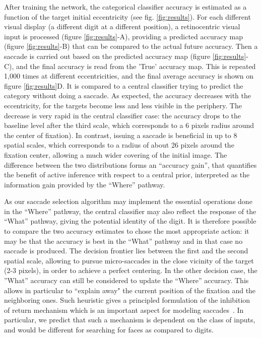 After training the network, the categorical classifier accuracy is estimated as a function of the target initial eccentricity (see fig. \ref{fig:results}). For each different visual display (a different digit at a different position), a retinocentric visual input is processed (figure \ref{fig:results}-A), providing a predicted accuracy map (figure \ref{fig:results}-B) that can be compared to the actual future accuracy. Then a saccade is carried out based on the predicted accuracy map (figure \ref{fig:results}-C), and the final accuracy is read from the 'True' accuracy map. This is repeated 1,000 times at different eccentricities, and the final average accuracy is shown on figure \ref{fig:results}D. It is compared to a central classifier trying to predict the category without doing a saccade.  
As expected, the  accuracy decreases with the eccentricity, for the targets become less and less visible in the periphery. 
The decrease is very rapid in the central classifier case: the accuracy drops to the baseline level after the third scale, which corresponds to a 6 pixels radius around the center of fixation). In contrast, issuing a saccade is beneficial in up to 8 spatial scales, which corresponds to a radius of about 26 pixels around the fixation center, allowing a much wider covering of the initial image. The difference between the two distributions forms an ``accuracy gain'', that quantifies the benefit of active inference with respect to a central prior, interpreted as the information gain provided by the ``Where'' pathway.


As our saccade selection algorithm may implement the essential operations done in the ``Where'' pathway, the central classifier may also reflect the response of the ``What'' pathway,  
giving the potential identity of the digit. %
It is therefore possible to compare the two accuracy estimates to chose the most appropriate action: it may be that the  accuracy is best in the ``What'' pathway and in that case no saccade is produced. 
The decision frontier lies between the first and the second spatial scale, allowing to pursue micro-saccades in the close vicinity of the target (2-3 pixels), in order to achieve a perfect centering.
In the other decision case, the ''What'' accuracy can still be considered to update the ``Where'' accuracy. 
This allows in particular to ``explain away" the current position of the fixation and the neighboring ones.
Such heuristic gives a principled formulation of the inhibition of return mechanism which is an important aspect for modeling saccades~\citep{Itti01}. In particular, we predict that such a mechanism is dependent on the class of inputs, and would be different for searching for faces as compared to digits.
